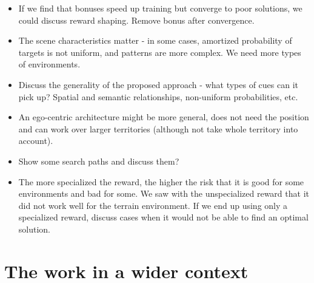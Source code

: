 \begin{itemize}
    \item If we find that bonuses speed up training but converge to poor solutions, we could discuss reward shaping. Remove bonus after convergence.
    \item The scene characteristics matter - in some cases, amortized probability of targets is not uniform, and patterns are more complex. We need more types of environments.
    \item Discuss the generality of the proposed approach - what types of cues can it pick up? Spatial and semantic relationships, non-uniform probabilities, etc. 
    \item An ego-centric architecture might be more general, does not need the position and can work over larger territories (although not take whole territory into account).
    \item Show some search paths and discuss them?
    \item The more specialized the reward, the higher the risk that it is good for some environments and bad for some. We saw with the unspecialized reward that it did not work well for the terrain environment. If we end up using only a specialized reward, discuss cases when it would not be able to find an optimal solution.
\end{itemize}

\section{The work in a wider context}
\label{sec:work-wider-context}

% 



